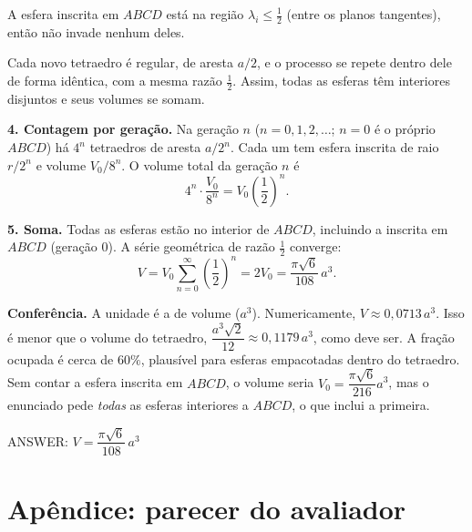 \documentclass{article}%
\begin{document}
A esfera inscrita em $ABCD$ está na região $\lambda_i\le\tfrac12$ (entre os planos tangentes), então não invade nenhum deles.

Cada novo tetraedro é regular, de aresta $a/2$, e o processo se repete dentro dele de forma idêntica, com a mesma razão $\tfrac12$. Assim, todas as esferas têm interiores disjuntos e seus volumes se somam.

\textbf{4. Contagem por geração.}
Na geração $n$ ($n=0,1,2,\dots$; $n=0$ é o próprio $ABCD$) há $4^{n}$ tetraedros de aresta $a/2^{n}$. Cada um tem esfera inscrita de raio $r/2^{n}$ e volume $V_0/8^{n}$. O volume total da geração $n$ é
\[
4^{n}\cdot\frac{V_0}{8^{n}}=V_0\left(\frac12\right)^{n}.
\]

\textbf{5. Soma.}
Todas as esferas estão no interior de $ABCD$, incluindo a inscrita em $ABCD$ (geração $0$). A série geométrica de razão $\tfrac12$ converge:
\[
V=V_0\sum_{n=0}^{\infty}\left(\frac12\right)^{n}=2V_0=\frac{\pi\sqrt6}{108}\,a^{3}.
\]

\textbf{Conferência.}
A unidade é a de volume ($a^{3}$). Numericamente, $V\approx 0{,}0713\,a^{3}$. Isso é menor que o volume do tetraedro, $\dfrac{a^{3}\sqrt2}{12}\approx0{,}1179\,a^{3}$, como deve ser. A fração ocupada é cerca de $60\%$, plausível para esferas empacotadas dentro do tetraedro. Sem contar a esfera inscrita em $ABCD$, o volume seria $V_0=\dfrac{\pi\sqrt6}{216}a^{3}$, mas o enunciado pede \emph{todas} as esferas interiores a $ABCD$, o que inclui a primeira.

ANSWER: $V=\dfrac{\pi\sqrt{6}}{108}\,a^{3}$%
\newpage%
\section*{Apêndice: parecer do avaliador}%
\end{document}
